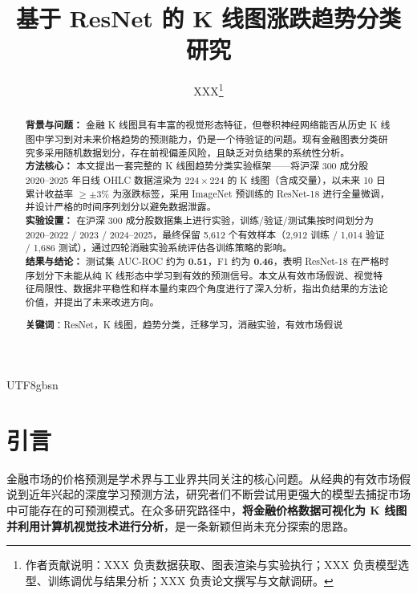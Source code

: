 \documentclass[12pt,a4paper]{article}
\begin{document}
\begin{CJK}{UTF8}{gbsn}

\title{\textbf{\large 基于 ResNet 的 K 线图涨跌趋势分类研究}}
\author{XXX\footnote{作者贡献说明：XXX 负责数据获取、图表渲染与实验执行；XXX 负责模型选型、训练调优与结果分析；XXX 负责论文撰写与文献调研。}}
\date{}
\maketitle

\begin{abstract}
\noindent
\textbf{背景与问题：} 金融 K 线图具有丰富的视觉形态特征，但卷积神经网络能否从历史 K 线图中学习到对未来价格趋势的预测能力，仍是一个待验证的问题。现有金融图表分类研究多采用随机数据划分，存在前视偏差风险，且缺乏对负结果的系统性分析。\\[4pt]
\textbf{方法核心：} 本文提出一套完整的 K 线图趋势分类实验框架——将沪深 300 成分股 2020--2025 年日线 OHLC 数据渲染为 $224\times224$ 的 K 线图（含成交量），以未来 10 日累计收益率 $\ge\pm3\%$ 为涨跌标签，采用 ImageNet 预训练的 ResNet-18 进行全量微调，并设计严格的时间序列划分以避免数据泄露。\\[4pt]
\textbf{实验设置：} 在沪深 300 成分股数据集上进行实验，训练/验证/测试集按时间划分为 2020--2022 / 2023 / 2024--2025，最终保留 5,612 个有效样本（2,912 训练 / 1,014 验证 / 1,686 测试），通过四轮消融实验系统评估各训练策略的影响。\\[4pt]
\textbf{结果与结论：} 测试集 AUC-ROC 约为 \textbf{0.51}，F1 约为 \textbf{0.46}，表明 ResNet-18 在严格时序划分下未能从纯 K 线形态中学习到有效的预测信号。本文从有效市场假说、视觉特征局限性、数据非平稳性和样本量约束四个角度进行了深入分析，指出负结果的方法论价值，并提出了未来改进方向。

\vspace{1em}
\noindent \textbf{关键词}：ResNet，K 线图，趋势分类，迁移学习，消融实验，有效市场假说
\end{abstract}

\section{引言}

金融市场的价格预测是学术界与工业界共同关注的核心问题。从经典的有效市场假说\cite{fama1970}到近年兴起的深度学习预测方法，研究者们不断尝试用更强大的模型去捕捉市场中可能存在的可预测模式。在众多研究路径中，\textbf{将金融价格数据可视化为 K 线图并利用计算机视觉技术进行分析}，是一条新颖但尚未充分探索的思路。


\end{CJK}
\end{document}
